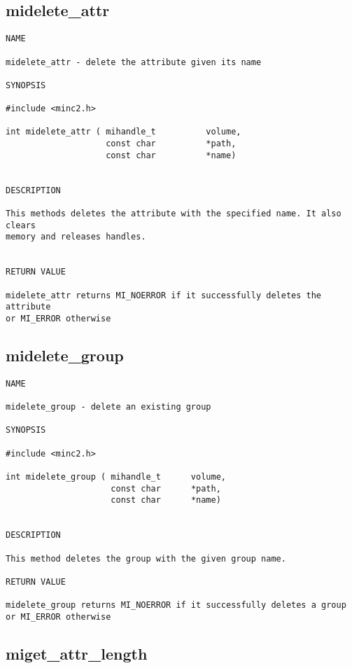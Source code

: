 \documentclass{article}
\begin{document}
\subsection{midelete\_attr}

\begin{verbatim}
NAME 

midelete_attr - delete the attribute given its name

SYNOPSIS

#include <minc2.h>

int midelete_attr ( mihandle_t          volume,
                    const char          *path,
                    const char          *name)
                       
                                
DESCRIPTION

This methods deletes the attribute with the specified name. It also clears 
memory and releases handles.


RETURN VALUE

midelete_attr returns MI_NOERROR if it successfully deletes the attribute
or MI_ERROR otherwise

\end{verbatim}

\subsection{midelete\_group}

\begin{verbatim}
NAME 

midelete_group - delete an existing group

SYNOPSIS

#include <minc2.h>

int midelete_group ( mihandle_t      volume,
                     const char      *path,
                     const char      *name)    
                       
                                
DESCRIPTION

This method deletes the group with the given group name.

RETURN VALUE

midelete_group returns MI_NOERROR if it successfully deletes a group 
or MI_ERROR otherwise

\end{verbatim}

\subsection{miget\_attr\_length}
\end{document}
